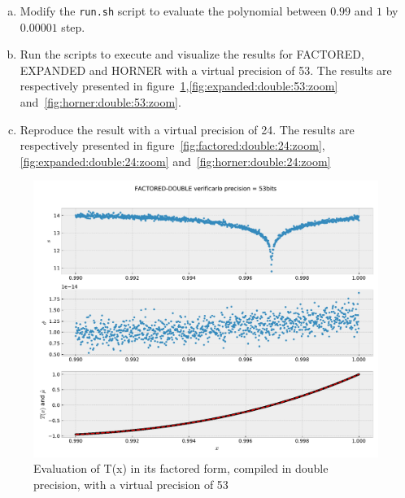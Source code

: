 \documentclass{TP}
\begin{document}
\begin{question}
  \begin{enumerate}[(a)]
    \item Modify the {\tt run.sh} script to evaluate the  polynomial between $0.99$ and $1$ by $0.00001$ step.
  \item Run the scripts to execute and visualize the results for
    FACTORED, EXPANDED and HORNER with a virtual precision of 53. The results are respectively presented in figure~\ref{fig:factored:double:53:zoom},\ref{fig:expanded:double:53:zoom}
    and~\ref{fig:horner:double:53:zoom}.

\item Reproduce the result with a virtual precision of 24. The results are respectively presented in figure~\ref{fig:factored:double:24:zoom},\ref{fig:expanded:double:24:zoom}
    and~\ref{fig:horner:double:24:zoom}

\end{enumerate}
\end{question}

\begin{figure}[h]
  \center \includegraphics[width=.8\textwidth]{FACTORED-DOUBLE-53-zoom.pdf}
  \caption{Evaluation of T(x) in its factored form, compiled in double
    precision, with a virtual precision of 53}
  \label{fig:factored:double:53:zoom}
\end{figure}
\end{document}
